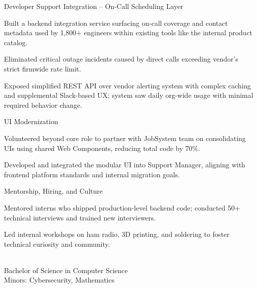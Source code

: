 \documentclass[10pt]{article}
\begin{document}
\begin{role}{Developer Support Integration -- On-Call Scheduling Layer}
    \item Built a backend integration service surfacing on-call coverage and contact metadata used by 1,800+ engineers within existing tools like the internal product catalog.
    \item Eliminated critical outage incidents caused by direct calls exceeding vendor's strict firmwide rate limit.
    \item Exposed simplified REST API over vendor alerting system with complex caching and supplemental Slack-based UX; system saw daily org-wide usage with minimal required behavior change.
\end{role}

\begin{role}{UI Modernization}
    \item Volunteered beyond core role to partner with JobSystem team on consolidating UIs using shared Web Components, reducing total code by 70\%.
    \item Developed and integrated the modular UI into Support Manager, aligning with frontend platform standards and internal migration goals.
\end{role}

\begin{role}{Mentorship, Hiring, and Culture}
    \item Mentored interns who shipped production-level backend code; conducted 50+ technical interviews and trained new interviewers.
    \item Led internal workshops on ham radio, 3D printing, and soldering to foster technical curiosity and community.
\end{role}

 \\
Bachelor of Science in Computer Science \\
Minors: Cybersecurity, Mathematics

\AtEndDocument{
  \renewcommand{\thefootnote}{}
  \renewcommand{\footnotemark}{}
  \renewcommand{\footnotetext}{}
}
\end{document}
